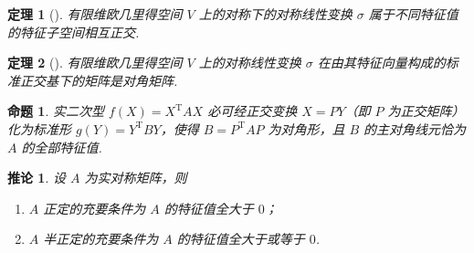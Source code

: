 \documentclass[zihao=-4,UTF8,linespread=1.8,nothm]{aytony_base}
\newtheorem{theorem}{\indent 定理}[subsection]
\newtheorem{proposition}{\indent 命题}[subsection]
\newtheorem*{corollary}{\indent 推论}
\begin{document}
\begin{theorem}[]
    有限维欧几里得空间 $V$ 上的对称下的对称线性变换 $\sigma$ 属于不同特征值的特征子空间相互正交.
\end{theorem}

\begin{theorem}[]
    有限维欧几里得空间 $V$ 上的对称线性变换 $\sigma$ 在由其特征向量构成的标准正交基下的矩阵是对角矩阵.
\end{theorem}

\begin{proposition}
    实二次型 $f(X) = X ^{\mathrm{T}}AX$ 必可经正交变换 $X = PY$（即 $P$ 为正交矩阵）化为标准形 $g(Y) = Y ^{\mathrm{T}}BY$，使得 $B = P ^{\mathrm{T}}AP$ 为对角形，且 $B$ 的主对角线元恰为 $A$ 的全部特征值.
\end{proposition}

\begin{corollary}
    设 $A$ 为实对称矩阵，则
    \begin{enumerate}[nosep]
        \item $A$ 正定的充要条件为 $A$ 的特征值全大于 $0$；
        \item $A$ 半正定的充要条件为 $A$ 的特征值全大于或等于 $0$.
    \end{enumerate}
\end{corollary}
\end{document}
